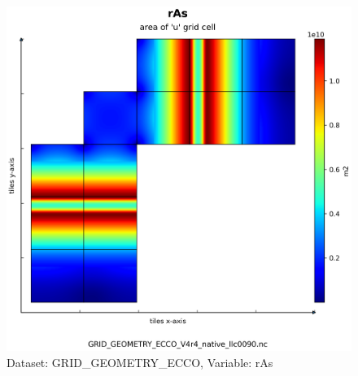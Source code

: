 \begin{figure}[H]
\centering
\includegraphics[scale=0.55]{../images/plots/native_plots_coords/Geometry_Parameters_for_the_Lat-Lon-Cap_90_(llc90)_Native_Model_Grid_(Version_4_Release_4)/rAs.png}
\caption{Dataset: GRID\_GEOMETRY\_ECCO, Variable: rAs}
\label{tab:table-GRID_GEOMETRY_ECCO_rAs-Plot}
\end{figure}
\pagebreak
